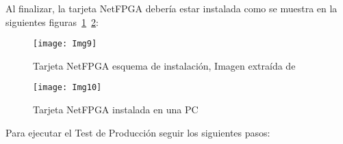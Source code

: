 Al finalizar, la tarjeta NetFPGA debería estar instalada como se muestra en la siguientes figuras~\ref{fig:Img9}~\ref{fig:Img10}:

\begin{figure}[htbp!] 
\centering    
\texttt{[image: Img9]}
\caption[Tarjeta NetFPGA esquema de instalación]{Tarjeta NetFPGA esquema de instalación, Imagen extra\'ida de \citep{NetFPGA6}}
\label{fig:Img9}
\end{figure}

\newpage
\begin{figure}[htbp!] 
\centering    
\texttt{[image: Img10]}
\caption[Tarjeta NetFPGA instalada en una PC]{Tarjeta NetFPGA instalada en una PC}
\label{fig:Img10}
\end{figure}

Para ejecutar el Test de Producción seguir los siguientes pasos:

